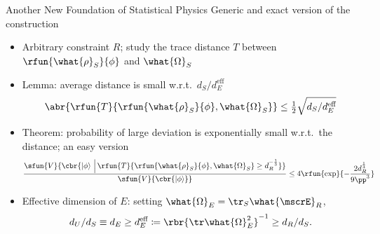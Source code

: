 \documentclass{beamer}
\begin{document}
\begin{frame}{Another New Foundation of Statistical Physics 
}{Generic and exact version of the construction}

\begin{itemize}
\item \alert{Arbitrary} constraint $R$; study the \alert{trace 
distance} $T$ between $\rfun{\what{\rho}_S}{\phi}$ and $\what{\Omega}_S$

\item Lemma: \alert{average distance} is small w.r.t.\ $d_S/d_E^\text{eff}$
\begin{equation}
\abr{\rfun{T}{\rfun{\what{\rho}_S}{\phi}, \what{\Omega}_S}} \le 
\tfrac{1}{2}\sqrt{d_S/d_E^\text{eff}}
\end{equation}

\item Theorem: \alert{probability of large deviation} is exponentially 
small w.r.t.\ the distance; an easy version
\begin{equation}
\frac{\sfun{V}{\cbr{\Ket{\phi} \,\Big |\,
\rfun{T}{\rfun{\what{\rho}_S}{\phi}, \what{\Omega}_S} \geq 
d_R^{-\frac{1}{3}}}}}
{\sfun{V}{\cbr{\Ket{\phi} }}} \leq
4\rfun{\exp}{- \frac{2d_R^{\frac{1}{3}}}{9\pp^3} }
\end{equation}

\item Effective dimension of $E$: setting
$\what{\Omega}_E = \tr_S \what{\mscrE}_R$,
\begin{equation}
d_U/d_S \equiv d_E \ge d_E^\text{eff}
\coloneqq \rbr{\tr \what{\Omega}_E^2}^{-1} \ge d_R/d_S.
\end{equation}

\end{itemize}

\end{frame}
\end{document}

